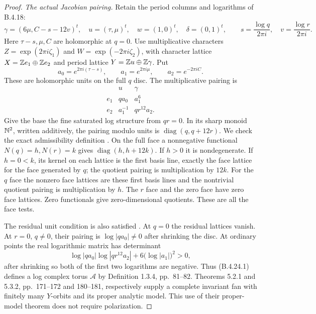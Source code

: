 \begin{proof}
\emph{The actual Jacobian pairing.}
Retain the period columns and logarithms of B.4.18:
\[
 \gamma=(6\mu,C-s-12v)^t,\quad
 u=(\tau,\mu)^t,\quad w=(1,0)^t,\quad\delta=(0,1)^t,
 \qquad
 s=\frac{\log q}{2\pi i},\quad
 v=\frac{\log r}{2\pi i}.
\]
Here $\tau-s,\mu,C$ are holomorphic at $q=0$.
Use multiplicative characters
$Z=\exp(2\pi i\zeta_1)$ and
$W=\exp(-2\pi i\zeta_2)$, with character lattice
$X=\mathbb Z e_1\oplus\mathbb Z e_2$ and period lattice
$Y=\mathbb Z u\oplus\mathbb Z\gamma$. Put
\[
 a_0=e^{2\pi i(\tau-s)},\qquad
 a_1=e^{2\pi i\mu},\qquad a_2=e^{-2\pi iC}.
\]
These are holomorphic units on the full $q$ disc.
The multiplicative pairing is
\[
 \begin{array}{c|cc}
       &u&\gamma\\\hline
 e_1&q a_0&a_1^6\\
 e_2&a_1^{-1}&q r^{12}a_2.
 \end{array}
 \tag{B.4.24.1}
\]
Give the base the fine saturated log structure from
$qr=0$. In its sharp monoid $\mathbb N^2$, written additively,
the pairing modulo units is $\operatorname{diag}(q,q+12r)$.
We check the exact admissibility definition
\citep[Definition 1.2.3, pp.~77--78]{KKN2008Root}.
On the full face a nonnegative functional
$N(q)=h,N(r)=k$ gives
$\operatorname{diag}(h,h+12k)$. If $h>0$ it is
nondegenerate. If $h=0<k$, its kernel on each lattice
is the first basis line, exactly the face lattice
for the face generated by $q$; the quotient pairing
is multiplication by $12k$. For the $q$ face the
nonzero face lattices are these first basis lines
and the nontrivial quotient pairing is multiplication
by $h$. The $r$ face and the zero face have zero
face lattices. Zero functionals give zero-dimensional
quotients. These are all the face tests.

The residual unit condition is also satisfied
\citep[Definition 1.2.6, p.~79]{KKN2008Root}.
At $q=0$ the residual lattices vanish. At $r=0$,
$q\ne0$, their pairing is $\log|q a_0|\ne0$ after
shrinking the disc. At ordinary points the real
logarithmic matrix has determinant
\[
 \log|q a_0|\log|q r^{12}a_2|
                 +6\bigl(\log|a_1|\bigr)^2>0,
\]
after shrinking so both of the first two logarithms
are negative. Thus (B.4.24.1) defines a log complex
torus $\mathcal A$ by Definition 1.3.4, pp.~81--82.
Theorems 5.2.1 and 5.3.2, pp.~171--172 and 180--181,
respectively supply a complete invariant fan with
finitely many $Y$-orbits and its proper analytic
model. This use of their proper-model theorem does
not require polarization.


\end{proof}
